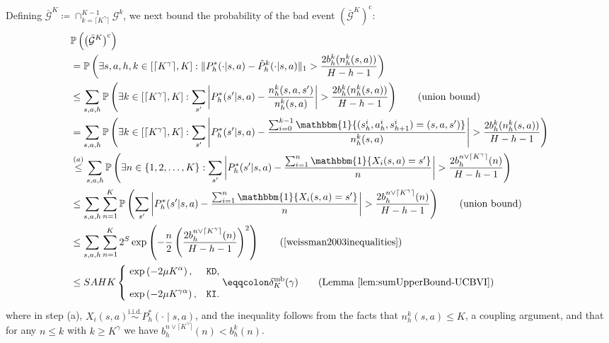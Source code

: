 \documentclass[11pt]{article}
\newcommand{\PP}{\mathbb{P}}
\newcommand{\KD} {\texttt{KD}}
\newcommand{\KI} {\texttt{KI}}
\begin{document}
Defining $\bar{\mathcal{G}}^K \coloneqq\cap_{k=\lceil K^\gamma\rceil}^{K-1}\mathcal{G}^k$, we next bound the probability of the bad event $\left(\bar{\mathcal{G}}^K\right)^\mathrm{c}$:
\begin{align*}
    &\PP \left(\left(\bar{\mathcal{G}}^K\right)^\mathrm{c}\right) \\
    &= \PP\left(\exists s,a,h,k \in [\lceil K^\gamma\rceil,K ]:
        \|P_h^*(\cdot|s,a)-\hat P_h^k(\cdot|s,a)\|_1 
        >  \frac{2b_h^k(n_h^k(s,a))}{H-h-1}\right) \\
    &\leq \sum_{s,a,h} 
        \PP\left(\exists k \in [\lceil K^\gamma\rceil,K ]:
        \sum_{s'} \left| P_h^*(s'|s,a)-
            \frac{n_h^k(s,a,s')}{n_h^k(s,a)}\right| 
        >  \frac{2b_h^k(n_h^k(s,a))}{H-h-1}\right) \tag{union bound}\\
    &= \sum_{s,a,h} 
        \PP\left(\exists k \in [\lceil K^\gamma\rceil,K ]:
        \sum_{s'} \left| P_h^*(s'|s,a)-
            \frac{\sum_{i=0}^{k-1}\mathbbm{1}\{(s^{i}_h,a^{i}_h,s^{i}_{h+1})=(s,a,s')\}}
                 {n_h^k(s,a)}\right| 
        >  \frac{2b_h^k(n_h^k(s,a))}{H-h-1}\right) \\
    &\overset{(a)}{\leq} \sum_{s,a,h} 
        \PP\left(
        \exists n \in \{1,2,\ldots,K\}:
        \sum_{s'} \left| P_h^*(s'|s,a)-
            \frac{\sum_{i=1}^{n}\mathbbm{1}\{X_i(s,a)=s'\}}{n}\right| 
        >  \frac{2b_h^{n \vee \lceil K^\gamma\rceil}(n)}{H-h-1} \right) \\
    &\leq \sum_{s,a,h}\sum_{n= 1}^K 
        \PP\left(
        \sum_{s'} \left| P_h^*(s'|s,a)-
            \frac{\sum_{i=1}^{n}\mathbbm{1}\{X_i(s,a)=s'\}}{n}\right| 
        >  \frac{2b_h^{n \vee \lceil K^\gamma\rceil}(n)}{H-h-1} \right) \tag{union bound}\\
    &\leq \sum_{s,a,h}\sum_{n=1}^K 
        2^{S}\exp\left(-  \frac{n}{2}  \left(\frac{2b_h^{n \vee \lceil K^\gamma\rceil}(n)}{H-h-1} \right)^2\right)
        \tag{\cite[Theorem 2.1]{weissman2003inequalities}}\\
    & \leq S A H K
    \begin{cases}
        \displaystyle \
           \exp\left(- 2\mu  K^{\alpha}\right),
        & \text{\KD}, \\[2ex]
        \displaystyle \ \exp\left(-2\mu K^{\gamma\alpha}\right),
        & \text{\KI}.
    \end{cases} \eqqcolon \delta_K^{\mathrm{mb}}(\gamma) \tag{Lemma \ref{lem:sumUpperBound-UCBVI}}
\end{align*}
where in step (a), $X_i(s,a)\overset{\text{i.i.d.}}{\sim} P_h^*(\cdot \mid s,a)$, and the inequality follows from the facts that $n_h^k(s,a) \leq K$, a coupling argument, and that for any $n\leq k$ with $k \geq K^\gamma$ we have $b_h^{n \vee \lceil K^\gamma\rceil}(n) < b_h^k(n)$.
\end{document}
